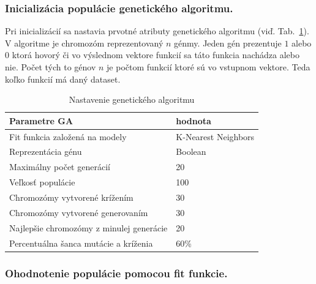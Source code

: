 \documentclass[runningheads]{llncs}
\begin{document}
\subsubsection{Inicializácia populácie genetického algoritmu.}

Pri inicializácií sa nastavia prvotné atributy genetického algoritmu (viď. Tab.~\ref{tab_nastavenie_gen_alg}). 
V algoritme je chromozóm reprezentovaný \begin{math}n\end{math} génmy. Jeden gén prezentuje \begin{math}1\end{math} 
alebo \begin{math}0\end{math} ktorá hovorý či vo výslednom vektore funkcií sa táto funkcia nachádza alebo nie. 
Počet tých to génov \begin{math}n\end{math} je počtom funkcií ktoré sú vo vstupnom vektore. Teda 
koľko funkcií má daný dataset.

\begin{table}[]
\centering
\caption{Nastavenie genetického algoritmu}\label{tab_nastavenie_gen_alg}
\begin{tabular}{|l|l|}
\hline
\textbf{Parametre GA}                    & \textbf{hodnota}  \\ \hline
Fit funkcia založená na modely           & K-Nearest Neighbors \\ \hline
Reprezentácia génu                       & Boolean  \\ \hline
Maximálny počet generácií                & 20       \\ \hline
Veľkosť populácie                        & 100      \\ \hline
Chromozómy vytvorené krížením            & 30       \\ \hline
Chromozómy vytvorené generovaním         & 30       \\ \hline
Najlepšie chromozómy z minulej generácie & 20       \\ \hline
Percentuálna šanca mutácie a kríženia    & 60\%     \\ \hline
\end{tabular}
\end{table}

\subsubsection{Ohodnotenie populácie pomocou fit funkcie.}
\end{document}
